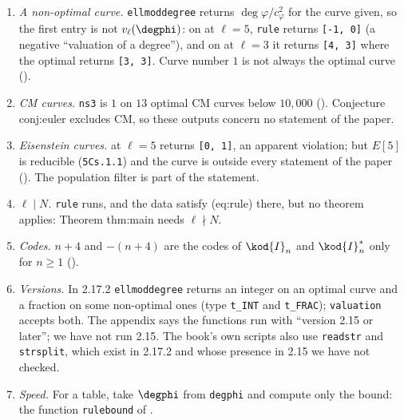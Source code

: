 \begin{sloppypar}
\begin{warning}\label{warn:computation:rule-pitfalls}
\begin{enumerate}[label=(\alph*)]
\item \emph{A non-optimal curve.} \texttt{ellmoddegree} returns $\deg\varphi/c_\varphi^2$ for the curve given, so the first entry is not $v_\ell(\degphi)$:
on  at $\ell=5$, \texttt{rule} returns \texttt{[-1, 0]} (a negative ``valuation of a degree''), and on  at $\ell=3$ it returns
\texttt{[4, 3]} where the optimal  returns \texttt{[3, 3]}. Curve number $1$ is not always the optimal curve
().
\item \emph{CM curves.} \texttt{ns3} is $1$ on $13$ optimal CM curves below $10{,}000$ (). Conjecture conj:euler excludes
CM, so these outputs concern no statement of the paper.
\item \emph{Eisenstein curves.}  at $\ell=5$ returns \texttt{[0, 1]}, an apparent violation; but $E[5]$ is reducible (\texttt{5Cs.1.1}) and the
curve is outside every statement of the paper (). The population filter is part of the statement.
\item \emph{$\ell\mid N$.} \texttt{rule} runs, and the data satisfy (eq:rule) there, but no theorem applies: Theorem thm:main needs $\ell\nmid N$.
\item \emph{Codes.} $n+4$ and $-(n+4)$ are the codes of $\kod{I}_n$ and $\kod{I}_n^*$ only for $n\ge1$ ().
\item \emph{Versions.} In 2.17.2 \texttt{ellmoddegree} returns an integer on an optimal curve and a fraction on some non-optimal ones
(type \texttt{t\_INT} and \texttt{t\_FRAC}); \texttt{valuation} accepts both. The appendix says the functions run with ``version 2.15 or later''; we
have not run 2.15. The book's own scripts also use \texttt{readstr} and \texttt{strsplit}, which exist in 2.17.2 and whose presence in 2.15 we
have not checked.
\item \emph{Speed.} For a table, take $\degphi$ from \texttt{degphi} and compute only the bound: the function \texttt{rulebound} of
.
\end{enumerate}
\end{warning}


\end{sloppypar}

